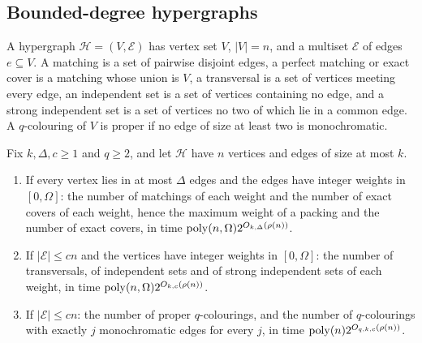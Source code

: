 \subsection{Bounded-degree hypergraphs}\label{ssec:hypergraphs}
A hypergraph $\mathcal H=(V,\mathcal E)$ has vertex set $V$, $|V|=n$, and a
multiset $\mathcal E$ of edges $e\subseteq V$. A matching is a set of pairwise
disjoint edges, a perfect matching or exact cover is a matching whose union is
$V$, a transversal is a set of vertices meeting every edge, an independent set is
a set of vertices containing no edge, and a strong independent set is a set of
vertices no two of which lie in a common edge. A $q$-colouring of $V$ is proper
if no edge of size at least two is monochromatic.

\begin{theorem}[Hypergraphs]\label{thm:hypergraphs}
Fix $k,\Delta,c\ge1$ and $q\ge2$, and let $\mathcal H$ have $n$ vertices and
edges of size at most $k$.
\begin{enumerate}[label=\textup{(\roman*)},leftmargin=2.2em]
\item\label{it:hmatch} If every vertex lies in at most $\Delta$ edges and the
edges have integer weights in $[0,\Omega]$: the number of matchings of each
weight and the number of exact covers of each weight, hence the maximum weight
of a packing and the number of exact covers, in time
$\operatorname{poly}(n,\Omega)2^{O_{k,\Delta}(\rho(n))}$.
\item\label{it:hindep} If $|\mathcal E|\le cn$ and the vertices have integer
weights in $[0,\Omega]$: the number of transversals, of independent sets and of
strong independent sets of each weight, in time
$\operatorname{poly}(n,\Omega)2^{O_{k,c}(\rho(n))}$.
\item\label{it:hcol} If $|\mathcal E|\le cn$: the number of proper
$q$-colourings, and the number of $q$-colourings with exactly $j$ monochromatic
edges for every $j$, in time $\operatorname{poly}(n)2^{O_{q,k,c}(\rho(n))}$.
\end{enumerate}
\end{theorem}

